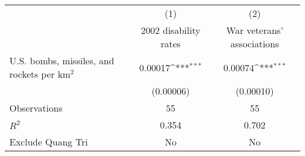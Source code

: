 {
\def\sym#1{\ifmmode^{#1}\else\(^{#1}\)\fi}
\begin{tabular}{l*{2}{c}}
\toprule
                    &\multicolumn{1}{c}{(1)}&\multicolumn{1}{c}{(2)}\\
                    &\multicolumn{1}{c}{2002 disability rates}&\multicolumn{1}{c}{War veterans' associations}\\
\midrule
U.S. bombs, missiles, and rockets per km$^2$&     0.00017\sym{***}&     0.00074\sym{***}\\
                    &   (0.00006)         &   (0.00010)         \\
\midrule
Observations        &          55         &          55         \\
\(R^{2}\)           &       0.354         &       0.702         \\
Exclude Quang Tri   &          No         &          No         \\
\bottomrule
\end{tabular}
}
